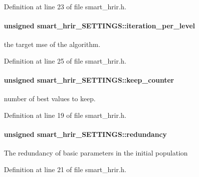 Definition at line 23 of file smart\-\_\-hrir.\-h.

\hypertarget{a00002_a5733558db24a20e91e237bc34eefa0dc}{
\paragraph[{iteration\-\_\-per\-\_\-level}]{\setlength{\rightskip}{0pt plus 5cm}unsigned smart\-\_\-hrir\-\_\-\-S\-E\-T\-T\-I\-N\-G\-S\-::iteration\-\_\-per\-\_\-level}}\label{a00002_a5733558db24a20e91e237bc34eefa0dc}
the target mse of the algorithm. 

Definition at line 25 of file smart\-\_\-hrir.\-h.

\hypertarget{a00002_a714475150bd7fe12b306d68785f67141}{
\paragraph[{keep\-\_\-counter}]{\setlength{\rightskip}{0pt plus 5cm}unsigned smart\-\_\-hrir\-\_\-\-S\-E\-T\-T\-I\-N\-G\-S\-::keep\-\_\-counter}}\label{a00002_a714475150bd7fe12b306d68785f67141}
number of best values to keep. 

Definition at line 19 of file smart\-\_\-hrir.\-h.

\hypertarget{a00002_ab061b89916ebae7f98218891bfa2f436}{
\paragraph[{redundancy}]{\setlength{\rightskip}{0pt plus 5cm}unsigned smart\-\_\-hrir\-\_\-\-S\-E\-T\-T\-I\-N\-G\-S\-::redundancy}}\label{a00002_ab061b89916ebae7f98218891bfa2f436}
The redundancy of basic parameters in the initial population 

Definition at line 21 of file smart\-\_\-hrir.\-h.

